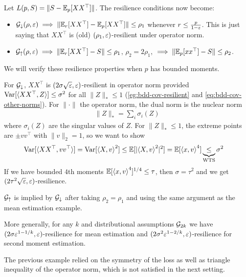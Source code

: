 \begin{example}
  Let $L(p, S) = \|S - \mathbb{E}_p[ X X^\top]\|$.
  The resilience conditions now become:
  \begin{itemize}
    \item
      $\mathcal{G}_\downarrow(\rho, \varepsilon) \implies \|\mathbb{E}_r[X X^\top] - \mathbb{E}_p[X X^\top]\| \leq \rho_1$
      whenever $r \leq \frac{p}{1-\varepsilon}$.
      This is just saying that $X X^\top$ is (old) $(\rho_1, \varepsilon)$-resilient under
      operator norm.

    \item
      $\mathcal{G}_\uparrow(\rho, \varepsilon) \implies \|\mathbb{E}_r[X X^\top] - S\| \leq \rho_1$,
      $\rho_2 = 2 \rho_1$, $\implies \|\mathbb{E}_p[x x^\top] - S\| \leq \rho_2$.
  \end{itemize}
  We will verify these resilience properties when $p$ has bounded moments.

  For $\mathcal{G}_\downarrow$, $X X^\top$ is $(2 \sigma \sqrt{\varepsilon}, \varepsilon)$-resilient
  in operator norm provided $\operatorname{Var}[\braket{X X^\top, Z}] \leq \sigma^2$ for
  all $\|Z\|_* \leq 1$
  (\cref{eg:bdd-cov-resilient} and \cref{eq:bdd-cov-other-norms}).
  For $\|\cdot\|$ the operator norm, the dual norm is the nuclear norm
  \begin{align}
    \|Z\|_* = \sum_i \sigma_i(Z)
  \end{align}
  where $\sigma_i(Z)$ are the singular values of $Z$.
  For $\|Z\|_* \leq 1$, the extreme points are $\pm v v^\top$
  with $\|v\|_2 = 1$, so we want to show
  \begin{align}
    \operatorname{Var}[\braket{X X^\top, v v^\top}]
    &= \operatorname{Var}[\braket{X, v}^2]
    \leq \mathbb{E}[\lvert \braket{X, v}^2 \rvert^2]
    = \mathbb{E}[\braket{x, v}^4]
    \underbrace{\leq}_{\text{WTS}} \sigma^2
  \end{align}
  If we have bounded $4$th moments
  $\mathbb{E}[\braket{x, v}^4]^{1/4} \leq \tau$,
  then $\sigma = \tau^2$ and we get $(2 \tau^2 \sqrt{\varepsilon}, \varepsilon)$-resilience.

  $\mathcal{G}_{\uparrow}$ is implied by $\mathcal{G}_{\downarrow}$ after taking
  $\rho_2 = \rho_1$ and using the same argument as the mean estimation example.

  More generally, for any $k$ and distributional assumptions $\mathcal{G}_{2k}$ we have
  $(2 \sigma \varepsilon^{1 - 1/k}, \varepsilon)$-resilience for mean estimation
  and $(2 \sigma^2 \varepsilon^{1 - 2/k}, \varepsilon)$-resilience for second moment estimation.
\end{example}

The previous example relied on the symmetry of the loss as well as
triangle inequality of the operator norm, which is not satisfied in the
next setting.

